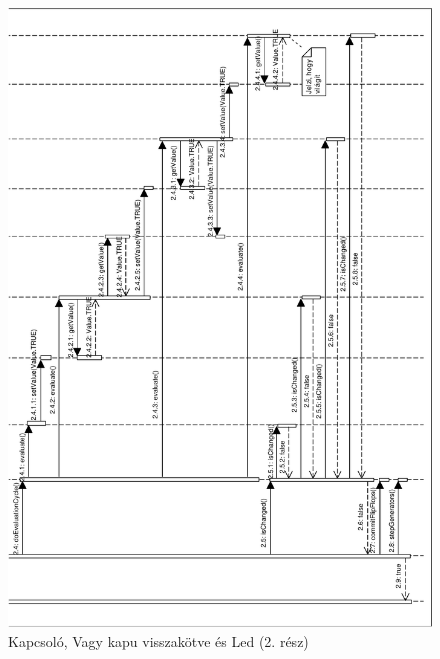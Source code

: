 \begin{figure}[H]
\begin{center}
\includegraphics[width=16cm]{chapters/chapter05/imgs/test5-2.pdf}
\caption{Kapcsoló, Vagy kapu visszakötve és Led (2. rész)}
\label{fig:init}
\end{center}
\end{figure}